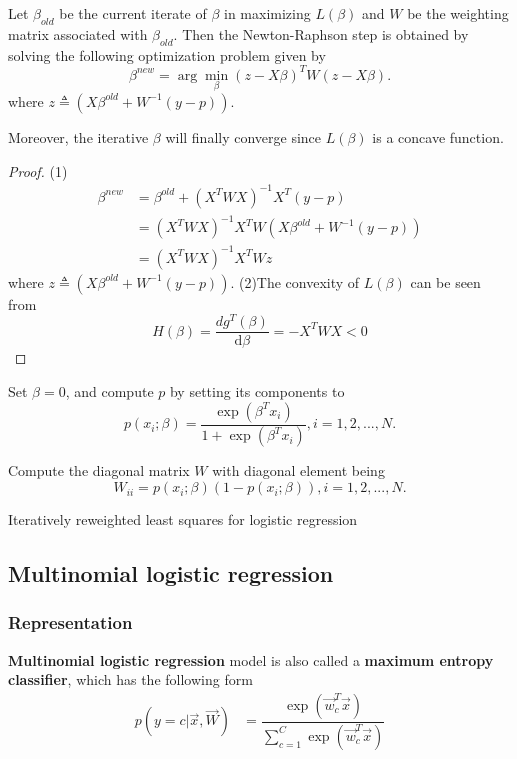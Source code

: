 \begin{refsection}
\begin{lemma}\cite[250]{murphy2012machine}
	Let $\beta_{old}$ be the current iterate of $\beta$ in maximizing $L(\beta)$ and $W$ be the weighting matrix associated with $\beta_{old}$. Then the Newton-Raphson step is obtained by solving the following optimization problem given by	
	$$\beta^{new} = \arg\min_{\beta}(z-X\beta)^TW(z-X\beta).$$
	where 	$z \triangleq (X\beta^{old} + W^{-1}(y-p))$.
	
	Moreover, the iterative $\beta$ will finally converge since $L(\beta)$ is a concave function.
\end{lemma}
\begin{proof}
	(1)	
	\begin{align*}
	\beta^{new} &= \beta^{old} + (X^TWX)^{-1}X^T(y-p) \\
	&=(X^TWX)^{-1}X^TW(X\beta^{old} + W^{-1}(y-p))\\
	&=(X^TWX)^{-1}X^TWz
	\end{align*}
	where $z \triangleq (X\beta^{old} + W^{-1}(y-p))$.
	(2)The convexity of $L(\beta)$ can be seen from 
	$$H(\beta) = \frac{d g^T(\beta)}{\mathrm{d} \beta} = -X^TWX<0$$
\end{proof}

\begin{algorithm}[H]
	\SetAlgoLined
	Set $\beta=0$, and compute $p$ by setting its components to
	$$p(x_i;\beta) = \frac{\exp(\beta^Tx_i)}{1 + \exp(\beta^Tx_i)},i=1,2,...,N.$$
	
	Compute the diagonal matrix $W$ with diagonal element being $$W_{ii} = p(x_i;\beta)(1 - p(x_i;\beta)),i=1,2,...,N.$$
	
	
	\caption{Iteratively reweighted least squares for logistic regression}
\end{algorithm}


\subsection{Multinomial logistic regression}


\subsubsection{Representation}
\begin{definition}
	\textbf{Multinomial logistic regression} model is also called a \textbf{maximum entropy classifier}, which has the following form
	\begin{align}
	p(y=c|\vec{x},\vec{W}) & =\dfrac{\exp(\vec{w}_c^T\vec{x})}{\sum_{c=1}^C \exp(\vec{w}_c^T\vec{x})}
	\end{align}
\end{definition}


\end{refsection}
